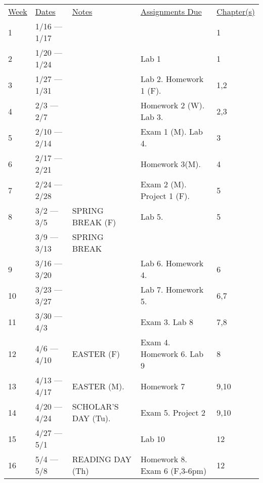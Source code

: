 \documentclass[10pt]{article}
\begin{document}
\begin{center}
\begin{tabular}{lllll}
\underline{Week} & \underline{Dates} & \underline{Notes} & \underline{Assignments Due} & \underline{Chapter(s)}\\
1 & 1/16 --- 1/17 & &  & 1  \\
2 & 1/20 --- 1/24 &  & Lab 1 & 1 \\
3 & 1/27 --- 1/31 & & Lab 2. Homework 1 (F). & 1,2 \\
4 & 2/3 --- 2/7 & &   Homework 2 (W). Lab 3. & 2,3 \\
5 & 2/10 --- 2/14 & & Exam 1 (M). Lab 4. & 3\\
6 & 2/17 --- 2/21 & & Homework 3(M).  & 4 \\
7 & 2/24 --- 2/28 & & Exam 2 (M). Project 1 (F). & 5 \\
8 & 3/2 --- 3/5 &  SPRING BREAK (F) &  Lab 5. & 5 \\
& 3/9 --- 3/13 &  SPRING BREAK & \\
9 & 3/16 --- 3/20 & & Lab 6. Homework 4. & 6\\
10 & 3/23 --- 3/27 & & Lab 7. Homework 5. & 6,7\\
11 & 3/30 --- 4/3 & & Exam 3. Lab 8 & 7,8\\
12 & 4/6 --- 4/10 & EASTER (F) & Exam 4. Homework 6. Lab 9 & 8 \\
13 & 4/13 --- 4/17 & EASTER (M).& Homework 7 & 9,10 \\
14 & 4/20 --- 4/24 & SCHOLAR'S DAY (Tu). & Exam 5. Project 2 & 9,10 \\
15 & 4/27 --- 5/1 & & Lab 10 & 12 \\
16 & 5/4 --- 5/8 & READING DAY (Th) & Homework 8. Exam 6 (F,3-6pm) & 12
\end{tabular}
\end{center}
\end{document}
